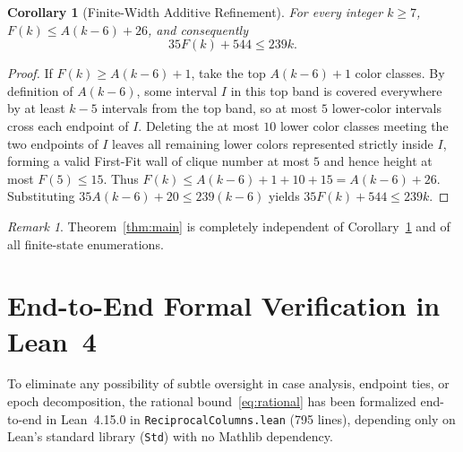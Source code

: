 \documentclass[11pt,a4paper]{article}
\newtheorem{corollary}[theorem]{Corollary}
\theoremstyle{remark}
\newtheorem{remark}[theorem]{Remark}
\begin{document}
\begin{corollary}[Finite-Width Additive Refinement]\label{cor:additive}
For every integer $k \ge 7$, $F(k) \le A(k - 6) + 26$, and consequently
\[
  35F(k) + 544 \le 239k.
\]
\end{corollary}

\begin{proof}
If $F(k) \ge A(k - 6) + 1$, take the top $A(k - 6) + 1$ color classes. By definition of $A(k - 6)$, some interval $I$ in this top band is covered everywhere by at least $k - 5$ intervals from the top band, so at most $5$ lower-color intervals cross each endpoint of $I$. Deleting the at most $10$ lower color classes meeting the two endpoints of $I$ leaves all remaining lower colors represented strictly inside $I$, forming a valid First-Fit wall of clique number at most $5$ and hence height at most $F(5) \le 15$. Thus $F(k) \le A(k - 6) + 1 + 10 + 15 = A(k - 6) + 26$. Substituting $35A(k - 6) + 20 \le 239(k - 6)$ yields $35F(k) + 544 \le 239k$.
\end{proof}

\begin{remark}
Theorem~\ref{thm:main} is completely independent of Corollary~\ref{cor:additive} and of all finite-state enumerations.
\end{remark}

\section{End-to-End Formal Verification in Lean~4}\label{sec:lean}

To eliminate any possibility of subtle oversight in case analysis, endpoint ties, or epoch decomposition, the rational bound~\eqref{eq:rational} has been formalized end-to-end in Lean~4.15.0 in \texttt{ReciprocalColumns.lean} (795 lines), depending only on Lean's standard library (\texttt{Std}) with no Mathlib dependency.
\end{document}
